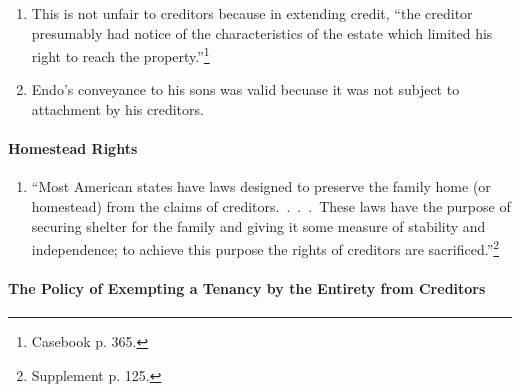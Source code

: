\begin{enumerate}
    legally unifie. They have a single ownership interest in a tenancy by the 
    entirety. ``Neither husband nor wife has a separate divisible interest in 
    the property held by the entirety that can be conveyed or reached by 
    execution.''\footnote{Casebook p. 364.}
    \item This is not unfair to creditors because in extending credit, ``the 
    creditor presumably had notice of the characteristics of the estate which 
    limited his right to reach the property.''\footnote{Casebook p. 365.}
    \item Endo's conveyance to his sons was valid becuase it was not subject 
    to attachment by his creditors.
\end{enumerate}

\paragraph{Homestead Rights}

\begin{enumerate}
    \item ``Most American states have laws designed to preserve the family 
    home (or homestead) from the claims of creditors.~.~.~.~These laws have 
    the purpose of securing shelter for the family and giving it some measure 
    of stability and independence; to achieve this purpose the rights of 
    creditors are sacrificed.''\footnote{Supplement p. 125.}
\end{enumerate}

\paragraph{The Policy of Exempting a Tenancy by the Entirety from Creditors}

